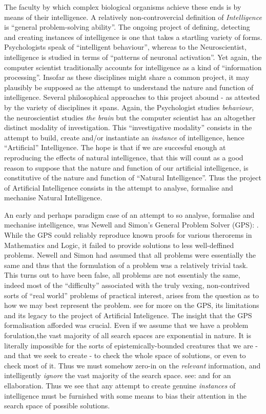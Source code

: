 \documentclass[12pt, twoside]{report}
\begin{document}
The faculty by which complex biological organisms achieve these ends is by means of their intelligence. A relatively non-controvercial definition of \textit{Intelligence} is ``general problem-solving ability''. The ongoing project of defining, detecting and creating instances of intelligence is one that takes a startling variety of forms. Psychologists speak of ``intelligent behaviour'', whereas to the Neuroscientist, intelligence is studied in terms of ``patterns of neuronal activation''. Yet again, the computer scientist traditionally accounts for intelligence as a kind of ``information processing''. Insofar as these disciplines might share a common project, it may plausibly be supposed as the attempt to understand the nature and function of intelligence. Several philosophical approaches to this project abound - as attested by the variety of disciplines it spans. Again, the Psychologist studies \textit{behaviour}, the neuroscientist studies \textit{the brain} but the computer scientist has an altogether distinct modality of investigation. This ``investigative modality'' consists in the attempt to build, create and/or instantiate an \textit{instance} of intelligence, hence ``Artificial'' Intelligence. The hope is that if we are succesful enough at reproducing the effects of natural intelligence, that this will count as a good reason to suppose that the nature and function of our artificial intelligence, is constitutive of the nature and function of ``Natural Intelligence''. Thus the project of Artificial Intelligence consists in the attempt to analyse, formalise and mechanise Natural Intelligence. 

An early and perhaps paradigm case of an attempt to so analyse, formalise and mechanise intelligence, was Newell and Simon's General Problem Solver (GPS): \textcite{Newell-Simon}.
While the GPS could reliably reproduce known proofs for various therorems in Mathematics and Logic, it failed to provide solutions to less well-deffined problems. Newell and Simon had assumed that all problems were essentially the same and thus that the formulation of a problem was a relatively trivial task. This turns out to have been false, all problems are not essentialy the same, indeed most of the ``difficulty'' associated with the truly vexing, non-contrived sorts of ``real world'' problems of practical interest, arises from the question as to how we may best represent the problem. see \textcite{AFTMT-Problem-Formulation} for more on the GPS, its limitations and its legacy to the project of Artificial Inteligence. The insight that the GPS formalisation afforded was crucial. Even if we assume that we have a problem forulation,the vast majority of all search spaces are exponential in nature. It is literally impossible for the sorts of epistemically-bounded creatures that we are - and that we seek to create - to check the whole space of solutions, or even to check most of it. Thus we must somehow zero-in on the \textit{relevant} information, and intelligently \textit{ignore} the vast majority of the search space. see: \textcite{RR-PP} and \textcite{RR-Emerging} for an ellaboration. Thus we see that any attempt to create genuine \textit{instances} of intelligence must be furnished with some means to bias their attention in the search space of possible solutions. 
\end{document}
